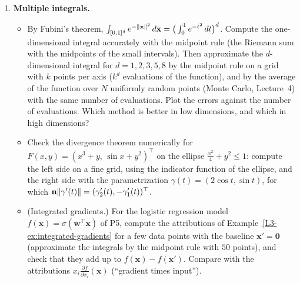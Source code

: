 \begin{enumerate}[label=\textbf{P\arabic*.}, leftmargin=*]
    \item \textbf{Multiple integrals.}
    \begin{itemize}
        \item By Fubini's theorem, $\int_{[0, 1]^d} e^{-\lVert \mathbf{x} \rVert^2}\, d\mathbf{x} = \big(\int_0^1 e^{-t^2}\, dt\big)^d$. Compute the one-dimensional integral accurately with the midpoint rule (the Riemann sum with the midpoints of the small intervals). Then approximate the $d$-dimensional integral for $d = 1, 2, 3, 5, 8$ by the midpoint rule on a grid with $k$ points per axis ($k^d$ evaluations of the function), and by the average of the function over $N$ uniformly random points (Monte Carlo, Lecture~4) with the same number of evaluations. Plot the errors against the number of evaluations. Which method is better in low dimensions, and which in high dimensions?
        \item Check the divergence theorem numerically for $F(x, y) = (x^3 + y, \, \sin x + y^2)^\top$ on the ellipse $\frac{x^2}{4} + y^2 \leq 1$: compute the left side on a fine grid, using the indicator function of the ellipse, and the right side with the parametrization $\gamma(t) = (2\cos t, \sin t)$, for which $\mathbf{n}\lVert \gamma'(t) \rVert = (\gamma_2'(t), -\gamma_1'(t))^\top$.
        \item (Integrated gradients.) For the logistic regression model $f(\mathbf{x}) = \sigma(\mathbf{w}^\top\mathbf{x})$ of P5, compute the attributions of Example~\ref{L3-ex:integrated-gradients} for a few data points with the baseline $\mathbf{x}' = \mathbf{0}$ (approximate the integrals by the midpoint rule with $50$ points), and check that they add up to $f(\mathbf{x}) - f(\mathbf{x}')$. Compare with the attributions $x_i\frac{\partial f}{\partial x_i}(\mathbf{x})$ (``gradient times input'').
    \end{itemize}


\end{enumerate}
